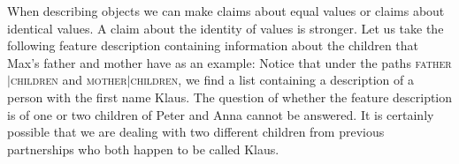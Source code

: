 When describing objects we can make claims about equal values or claims about identical values.
A claim about the identity of values is stronger. Let us take the following feature description containing
information about the children that Max's father and mother have as an example:
\ea
{}
\z
Notice that under the paths \textsc{father$|$children} and \textsc{mother$|$children}, we find a
list containing a description of a person with the first name Klaus. The question of whether the
feature description is of one or two children of Peter and Anna cannot be answered. It is certainly
possible that we are dealing with two different children from previous partnerships who both happen to be called
Klaus.

